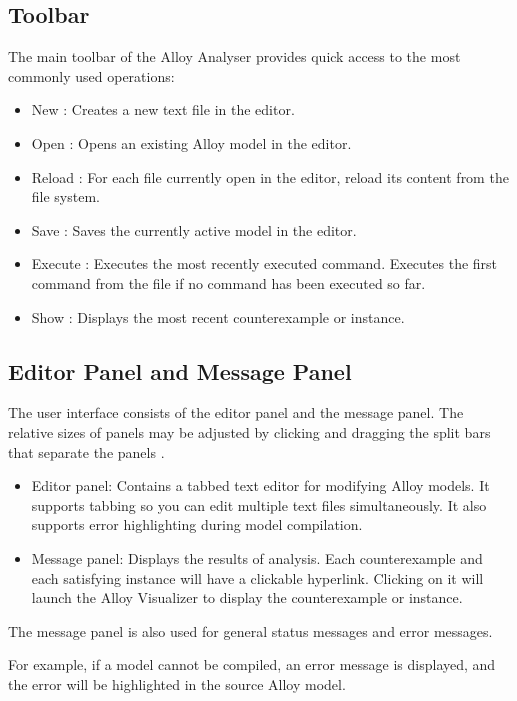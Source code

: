 \documentclass[a4paper,10pt]{report}
\begin{document}
\subsection{Toolbar}
\label{Tools}

The main toolbar of the Alloy Analyser provides quick access to the most commonly used operations:
\begin{itemize}
\item New : Creates a new text file in the editor.
\item Open : Opens an existing Alloy model in the editor.
\item Reload : For each file currently open in the editor, reload its content from the file system.
\item Save : Saves the currently active model in the editor.
\item Execute : Executes the most recently executed command. Executes the first command from the file if no command has been executed so far.
\item Show : Displays the most recent counterexample or instance.
\end{itemize}

\subsection{Editor Panel and Message Panel}
\label{Editor and Message Panel}

The user interface consists of the editor panel and the message panel. The relative sizes of panels may be adjusted by clicking and dragging the split bars that separate the panels \cite{DanielJackson}.
\begin{itemize}
\item 	Editor panel: Contains a tabbed text editor for modifying Alloy models. It supports tabbing so you can edit multiple text files simultaneously. It also supports error highlighting during model compilation.
\item 	Message panel: Displays the results of analysis. Each counterexample and each satisfying instance will have a clickable hyperlink. Clicking on it will launch the Alloy Visualizer to display the counterexample or instance.
\end{itemize}
The message panel is also used for general status messages and error messages.

For example, if a model cannot be compiled, an error message is displayed, and the error will be highlighted in the source Alloy model.
\end{document}
